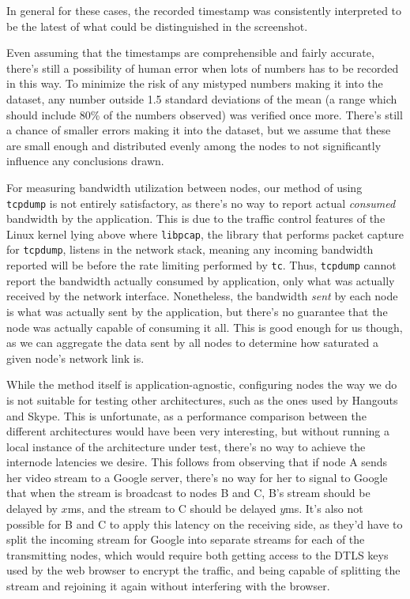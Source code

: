 In general for these cases, the recorded timestamp was consistently interpreted to be the latest of what could be distinguished in the screenshot.

Even assuming that the timestamps are comprehensible and fairly accurate, there's still a possibility of human error when lots of numbers has to be recorded in this way. To minimize the risk of any mistyped numbers making it into the dataset, any number outside 1.5 standard deviations of the mean (a range which should include 80\% of the numbers observed) was verified once more. There's still a chance of smaller errors making it into the dataset, but we assume that these are small enough and distributed evenly among the nodes to not significantly influence any conclusions drawn.

For measuring bandwidth utilization between nodes, our method of using \texttt{tcpdump} is not entirely satisfactory, as there's no way to report actual \emph{consumed} bandwidth by the application. This is due to the traffic control features of the Linux kernel lying above where \texttt{libpcap}, the library that performs packet capture for \texttt{tcpdump}, listens in the network stack, meaning any incoming bandwidth reported will be before the rate limiting performed by \texttt{tc}. Thus, \texttt{tcpdump} cannot report the bandwidth actually consumed by application, only what was actually received by the network interface. Nonetheless, the bandwidth \emph{sent} by each node is what was actually sent by the application, but there's no guarantee that the node was actually capable of consuming it all. This is good enough for us though, as we can aggregate the data sent by all nodes to determine how saturated a given node's network link is.

While the method itself is application-agnostic, configuring nodes the way we do is not suitable for testing other architectures, such as the ones used by Hangouts and Skype. This is unfortunate, as a performance comparison between the different architectures would have been very interesting, but without running a local instance of the architecture under test, there's no way to achieve the internode latencies we desire. This follows from observing that if node A sends her video stream to a Google server, there's no way for her to signal to Google that when the stream is broadcast to nodes B and C, B's stream should be delayed by $x$ms, and the stream to C should be delayed $y$ms. It's also not possible for B and C to apply this latency on the receiving side, as they'd have to split the incoming stream for Google into separate streams for each of the transmitting nodes, which would require both getting access to the DTLS keys used by the web browser to encrypt the traffic, and being capable of splitting the stream and rejoining it again without interfering with the browser.


